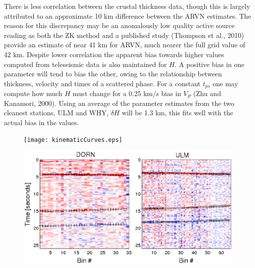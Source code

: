 \documentclass[review]{elsarticle}
\begin{document}
There is less correlation between the crustal thickness data, though this is largely attributed to an approximate 10 km difference between the ARVN estimates. The reason for this discrepancy may be an anomalously low quality active source reading as both the ZK method and a published study (Thompson et al., 2010) provide an estimate of near 41 km for ARVN, much nearer the full grid value of 42 km. Despite lower correlation the apparent bias towards higher values computed from teleseismic data is also maintained for $H$. A positive bias in one parameter will tend to bias the other, owing to the relationship between thickness, velocity and times of a scattered phase. For a constant $t_{ps}$ one may compute how much $H$ must change for a 0.25 km/s bias in $V_P$ (Zhu and Kanamori, 2000). Using an average of the parameter estimates from the two cleanest stations, ULM and WHY, $\delta H$ will be 1.3 km, this fits well with the actual bias in the values.


\begin{figure}
  \centering
  \texttt{[image: kinematicCurves.eps]}
  \caption{}
  \label{fig:kcurves}
\end{figure}

\begin{figure}
  \centering
  \includegraphics[width=\textwidth]{rfDORNULM.eps}
  \caption{}
  \label{fig:rfs}
\end{figure}
\end{document}
